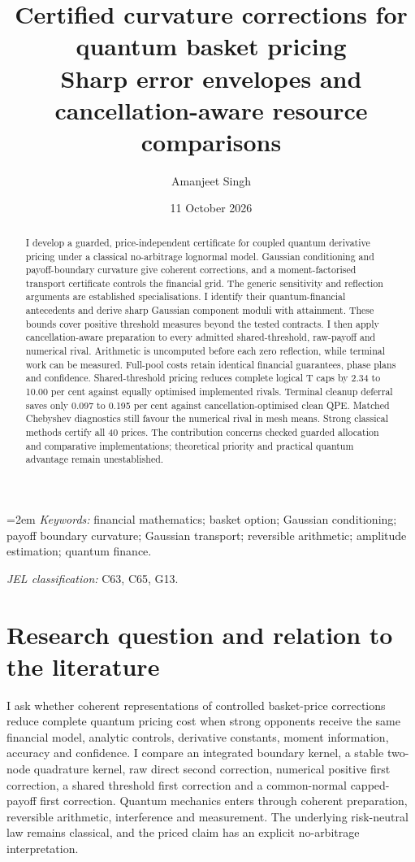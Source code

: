 \documentclass[11pt]{article}
\title{Certified curvature corrections for quantum basket pricing\\[3mm]
\large Sharp error envelopes and cancellation-aware resource comparisons}
\author{Amanjeet Singh}
\date{11 October 2026}
\begin{document}
\maketitle
\begin{abstract}
I develop a guarded, price-independent certificate for coupled quantum
derivative pricing under a classical no-arbitrage lognormal model.
Gaussian conditioning and payoff-boundary curvature give coherent corrections,
and a moment-factorised transport certificate controls the financial grid.
The generic sensitivity and reflection arguments are established
specialisations. I identify their quantum-financial antecedents and derive
sharp Gaussian component moduli with attainment. These bounds cover positive
threshold measures beyond the tested contracts. I then apply
cancellation-aware preparation to every admitted shared-threshold,
raw-payoff and numerical rival. Arithmetic is uncomputed before each zero
reflection, while terminal work can be measured. Full-pool costs retain
identical financial guarantees, phase plans and confidence. Shared-threshold
pricing reduces complete logical T caps by 2.34 to 10.00 per cent against
equally optimised implemented rivals. Terminal cleanup deferral saves only
0.097 to 0.195 per cent against cancellation-optimised clean QPE.
Matched Chebyshev diagnostics still favour the numerical rival in mesh means.
Strong classical methods certify all 40 prices. The contribution concerns
checked guarded allocation and comparative implementations; theoretical
priority and practical quantum advantage remain unestablished.
\end{abstract}

\smallskip
\noindent\begin{minipage}{\linewidth}
\small\emergencystretch=2em
\textit{Keywords:} financial mathematics; basket option; Gaussian conditioning;
payoff boundary curvature; Gaussian transport; reversible arithmetic;
amplitude estimation; quantum finance.\par
\smallskip
\textit{JEL classification:} C63, C65, G13.\par
\end{minipage}

\section{Research question and relation to the literature}
\label{sec:question}

I ask whether coherent representations of controlled basket-price
corrections reduce complete quantum pricing cost when strong opponents
receive the same financial model, analytic controls, derivative constants,
moment information, accuracy and confidence. I compare an integrated
boundary kernel, a stable two-node quadrature kernel, raw direct second
correction, numerical positive first correction, a shared threshold
first correction and a common-normal capped-payoff first correction. Quantum
mechanics enters through coherent preparation, reversible arithmetic,
interference and measurement. The underlying risk-neutral law remains
classical, and the priced claim has an explicit no-arbitrage interpretation.
\end{document}
